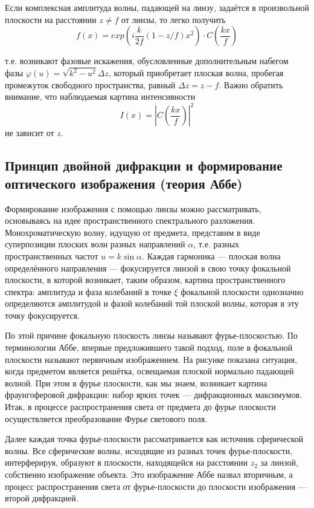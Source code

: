 Если комплексная амплитуда волны, падающей на линзу, задаётся в произвольной плоскости на расстоянии $z \ne f$ от линзы, то легко получить
\[
    f(x) = exp\left(i\frac{k}{2f}(1 - z / f)x^2\right) \cdot C\left(\frac{kx}{f}\right)
\]

т.е. возникают фазовые искажения, обусловленные дополнительным набегом фазы $\varphi(u) = \sqrt{k^2 - u^2}\Delta z$, который приобретает плоская волна, пробегая промежуток свободного пространства, равный $\Delta z = z - f$. Важно обратить внимание, что наблюдаемая картина интенсивности
\[
I(x) = \left|C\left(\frac{kx}{f }\right)\right|^2
\]
не зависит от $z$.

\subsection{Принцип двойной дифракции и формирование оптического изображения (теория Аббе)}

\begin{figure}[ht!]
\end{figure}

Формирование изображения с помощью линзы можно рассматривать, основываясь на идее пространственного спектрального разложения. Монохроматическую волну, идущую от предмета, представим в виде суперпозиции плоских волн разных направлений $\alpha$, т.е.  разных пространственных частот $u=k\sin\alpha$. Каждая гармоника --- плоская волна определённого направления --- фокусируется линзой в свою точку фокальной плоскости, в которой возникает, таким образом, картина пространственного спектра: амплитуда и фаза колебаний в точке $\xi$ фокальной плоскости однозначно определяются амплитудой и фазой колебаний той плоской волны, которая в эту точку фокусируется.

По этой причине фокальную плоскость линзы называют фурье-плоскостью. По терминологии Аббе, впервые предложившего такой подход, поле в фокальной плоскости называют первичным изображением. На рисунке показана ситуация, когда предметом является решётка, освещаемая плоской нормально падающей волной. При этом в фурье плоскости, как мы знаем, возникает картина фраунгоферовой дифракции: набор ярких точек --- дифракционных максимумов. Итак, в процессе распространения света от предмета до фурье плоскости осуществляется преобразование Фурье светового поля.

Далее каждая точка фурье-плоскости рассматривается как источник сферической волны. Все сферические волны, исходящие из разных точек фурье-плоскости, интерферируя, образуют в плоскости, находящейся на расстоянии $z_2$ за линзой, собственно изображение объекта. Это изображение Аббе назвал вторичным, а процесс распространения света от фурье-плоскости до плоскости изображения --- второй дифракцией.

